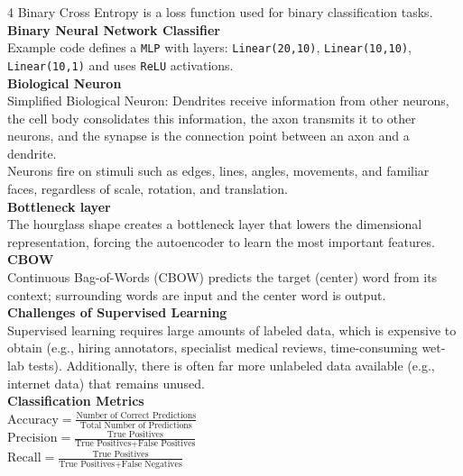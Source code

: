 \documentclass[8pt]{extarticle}
\begin{document}
\begin{multicols}{4}
Binary Cross Entropy is a loss function used for binary classification tasks.\\
\vspace{2pt}\textbf{Binary Neural Network Classifier}\\
Example code defines a \texttt{MLP} with layers: \texttt{Linear(20,10)}, \texttt{Linear(10,10)}, \texttt{Linear(10,1)} and uses \texttt{ReLU} activations.\\
\vspace{2pt}\textbf{Biological Neuron}\\
Simplified Biological Neuron: Dendrites receive information from other neurons, the cell body consolidates this information, the axon transmits it to other neurons, and the synapse is the connection point between an axon and a dendrite.\\
Neurons fire on stimuli such as edges, lines, angles, movements, and familiar faces, regardless of scale, rotation, and translation.\\
\vspace{2pt}\textbf{Bottleneck layer}\\
The hourglass shape creates a bottleneck layer that lowers the dimensional representation, forcing the autoencoder to learn the most important features.\\
\vspace{2pt}\textbf{CBOW}\\
Continuous Bag-of-Words (CBOW) predicts the target (center) word from its context; surrounding words are input and the center word is output.\\
\vspace{2pt}\textbf{Challenges of Supervised Learning}\\
Supervised learning requires large amounts of labeled data, which is expensive to obtain (e.g., hiring annotators, specialist medical reviews, time-consuming wet-lab tests). Additionally, there is often far more unlabeled data available (e.g., internet data) that remains unused.\\
\vspace{2pt}\textbf{Classification Metrics}\\
$ \text{Accuracy} = \frac{\text{Number of Correct Predictions}}{\text{Total Number of Predictions}} $\\
$ \text{Precision} = \frac{\text{True Positives}}{\text{True Positives} + \text{False Positives}} $\\
$ \text{Recall} = \frac{\text{True Positives}}{\text{True Positives} + \text{False Negatives}} $\\


\end{multicols}
\end{document}
